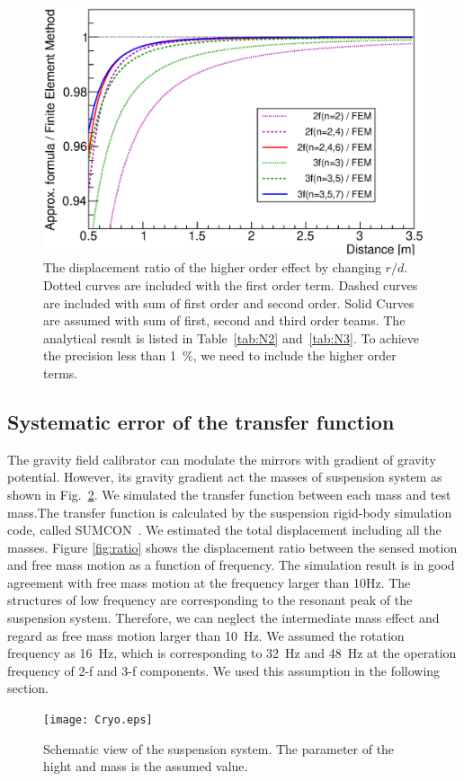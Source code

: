 \documentclass[A4]{spie}  %
\begin{document}
\begin{figure}
\begin{center}
\includegraphics[width=12cm]{dvsx_ratio.eps}
\caption{The displacement ratio of the higher order effect by changing $r/d$. Dotted curves are included with the first order term. Dashed curves are included with sum of first order and second order. Solid Curves are assumed with sum of first, second and third order teams. The analytical result is listed in Table~\ref{tab:N2} and~\ref{tab:N3}. To achieve the precision less than 1~\%, we need to include the higher order terms.}
\label{fig:FEM}
\end{center}
\end{figure}


\subsection{Systematic error of the transfer function}
The gravity field calibrator can modulate the mirrors with gradient of gravity potential. However, its gravity gradient act the masses of suspension system as shown in Fig.~\ref{fig:cryo}. We simulated the transfer function between each mass and test mass.The transfer function is calculated by the suspension rigid-body simulation code, called SUMCON~\cite{`}. We estimated the total displacement including all the masses. Figure \ref{fig:ratio} shows the displacement ratio between the sensed motion and free mass motion as a function of frequency. The simulation result is in good agreement with free mass motion at the frequency larger than 10Hz. The structures of low frequency are corresponding to the resonant peak of the suspension system. Therefore, we can neglect the intermediate mass effect and regard as free mass motion larger than 10~Hz. We assumed the rotation frequency as 16~Hz, which is corresponding to 32~Hz and 48~Hz at the operation frequency of 2-f and 3-f components.  We used this assumption in the following section.
\begin{figure}
\begin{center}
\texttt{[image: Cryo.eps]}
\caption{Schematic view of the suspension system. The parameter of the hight and mass is the assumed value. }
\label{fig:cryo}
\end{center}
\end{figure}
\end{document}
